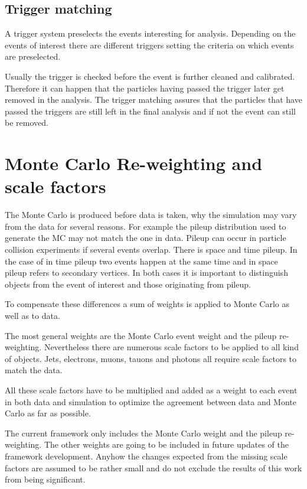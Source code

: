 \subsection{Trigger matching}

A trigger system preselects the events interesting for analysis. Depending on the events of interest there are different triggers setting the criteria on which events are preselected.

Usually the trigger is checked before the event is further cleaned and calibrated. Therefore it can happen that the particles having passed the trigger later get removed in the analysis. The trigger matching assures that the particles that have passed the triggers are still left in the final analysis and if not the event can still be removed.

\section{Monte Carlo Re-weighting and scale factors}

The Monte Carlo is produced before data is taken, why the simulation may vary from the data for several reasons. For example the pileup distribution used to generate the MC may not match the one in data. Pileup can occur in particle collision experiments if several events overlap. There is space and time pileup. In the case of in time pileup two events happen at the same time and in space pileup refers to secondary vertices. In both cases it is important to distinguish objects from the event of interest and those originating from pileup.

To compensate these differences a sum of weights is applied to Monte Carlo as well as to data.

The most general weights are the Monte Carlo event weight and the pileup re-weighting. Nevertheless there are numerous scale factors to be applied to all kind of objects. Jets, electrons, muons, tauons and photons all require scale factors to match the data. 

All these scale factors have to be multiplied and added as a weight to each event in both data and simulation to optimize the agreement between data and Monte Carlo as far as possible.

The current framework only includes the Monte Carlo weight and the pileup re-weighting. The other weights are going to be included in future updates of the framework development. Anyhow the changes expected from the missing scale factors are assumed to be rather small and do not exclude the results of this work from being significant.

